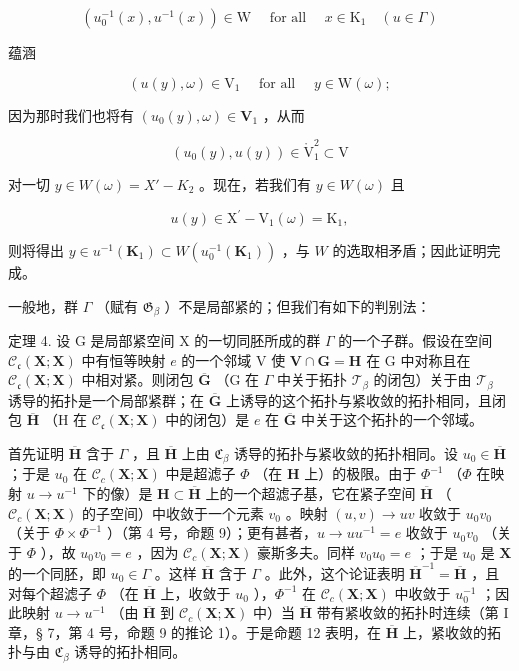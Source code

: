 \[
\left(u _ {0} ^ {- 1} (x), u ^ {- 1} (x)\right) \in \mathrm{W} \quad \text { for   all } \quad x \in \mathrm{K} _ {1} \quad (u \in \Gamma)
\]

蕴涵

\[
(u (y), \omega) \in \mathrm{V} _ {1} \quad \text { for   all } \quad y \in \mathrm{W} (\omega);
\]

因为那时我们也将有 \((u_0(y),\omega)\in \mathbf{V}_1\) ，从而

\[
(u _ {0} (y), u (y)) \in \mathring {\mathrm{V}} _ {1} ^ {2} \subset \mathrm{V}
\]

对一切 \(y \in W(\omega) = X' - K_2\) 。现在，若我们有 \(y \in W(\omega)\) 且

\[
u (y) \in \mathrm{X} ^ {\prime} - \mathrm{V} _ {1} (\omega) = \mathrm{K} _ {1},
\]

则将得出 \(y \in u^{-1}(\mathbf{K}_1) \subset W(u_0^{-1}(\mathbf{K}_1))\) ，与 \(W\) 的选取相矛盾；因此证明完成。

一般地，群 \(\Gamma\) （赋有 \(\mathfrak{G}_{\beta}\) ）不是局部紧的；但我们有如下的判别法：

定理 4. 设 G 是局部紧空间 X 的一切同胚所成的群 \(\Gamma\) 的一个子群。假设在空间 \(\mathcal{C}_{\mathfrak{c}}(\mathbf{X};\mathbf{X})\) 中有恒等映射 \(e\) 的一个邻域 V 使 \(\mathbf{V}\cap \mathbf{G} = \mathbf{H}\) 在 G 中对称且在 \(\mathcal{C}_{\mathfrak{c}}(\mathbf{X};\mathbf{X})\) 中相对紧。则闭包 \(\overline{\mathbf{G}}\) （G 在 \(\Gamma\) 中关于拓扑 \(\mathcal{T}_{\beta}\) 的闭包）关于由 \(\mathcal{T}_{\beta}\) 诱导的拓扑是一个局部紧群；在 \(\overline{\mathbf{G}}\) 上诱导的这个拓扑与紧收敛的拓扑相同，且闭包 \(\overline{\mathbf{H}}\) （H 在 \(\mathcal{C}_{\mathfrak{c}}(\mathbf{X};\mathbf{X})\) 中的闭包）是 \(e\) 在 \(\overline{\mathbf{G}}\) 中关于这个拓扑的一个邻域。

首先证明 \(\overline{\mathbf{H}}\) 含于 \(\Gamma\) ，且 \(\overline{\mathbf{H}}\) 上由 \(\mathfrak{C}_{\beta}\) 诱导的拓扑与紧收敛的拓扑相同。设 \(u_0 \in \overline{\mathbf{H}}\) ；于是 \(u_0\) 在 \(\mathcal{C}_c(\mathbf{X}; \mathbf{X})\) 中是超滤子 \(\Phi\) （在 \(\mathbf{H}\) 上）的极限。由于 \(\Phi^{-1}\) （\(\Phi\) 在映射 \(u \to u^{-1}\) 下的像）是 \(\mathbf{H} \subset \overline{\mathbf{H}}\) 上的一个超滤子基，它在紧子空间 \(\overline{\mathbf{H}}\) （\(\mathcal{C}_c(\mathbf{X}; \mathbf{X})\) 的子空间）中收敛于一个元素 \(v_0\) 。映射 \((u, v) \to uv\) 收敛于 \(u_0 v_0\) （关于 \(\Phi \times \Phi^{-1}\) ）（第 4 号，命题 9）；更有甚者，\(u \to uu^{-1} = e\) 收敛于 \(u_0 v_0\) （关于 \(\Phi\) ），故 \(u_0 v_0 = e\) ，因为 \(\mathcal{C}_c(\mathbf{X}; \mathbf{X})\) 豪斯多夫。同样 \(v_0 u_0 = e\) ；于是 \(u_0\) 是 \(\mathbf{X}\) 的一个同胚，即 \(u_0 \in \Gamma\) 。这样 \(\overline{\mathbf{H}}\) 含于 \(\Gamma\) 。此外，这个论证表明 \(\overline{\mathbf{H}}^{-1} = \overline{\mathbf{H}}\) ，且对每个超滤子 \(\Phi\) （在 \(\overline{\mathbf{H}}\) 上，收敛于 \(u_0\) ），\(\Phi^{-1}\) 在 \(\mathcal{C}_c(\mathbf{X}; \mathbf{X})\) 中收敛于 \(u_0^{-1}\) ；因此映射 \(u \to u^{-1}\) （由 \(\overline{\mathbf{H}}\) 到 \(\mathcal{C}_c(\mathbf{X}; \mathbf{X})\) 中）当 \(\overline{\mathbf{H}}\) 带有紧收敛的拓扑时连续（第 I 章，§ 7，第 4 号，命题 9 的推论 1）。于是命题 12 表明，在 \(\overline{\mathbf{H}}\) 上，紧收敛的拓扑与由 \(\mathfrak{C}_{\beta}\) 诱导的拓扑相同。

